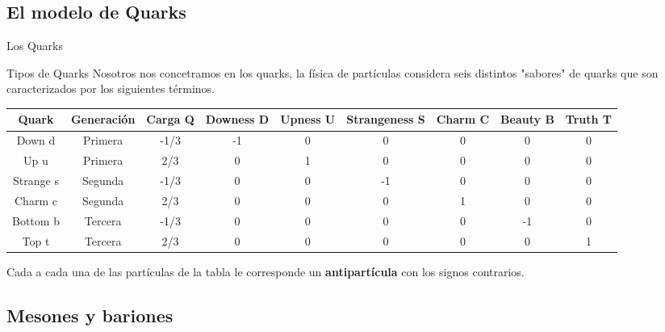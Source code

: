 \subsection{El modelo de Quarks}

\begin{frame}{Los Quarks}
    \begin{block}{Tipos de Quarks}
        Nosotros nos concetramos en los quarks, la física de partículas considera seis distintos "sabores" de quarks que son caracterizados por los siguientes términos.
    \end{block}
    \begin{table}[h]
        \centering
        \begin{adjustbox}{max width=\textwidth}
          \begin{tabular}{c|c|c|c|c|c|c|c|c}
            Quark &  Generación & Carga Q & Downess D & Upness U & Strangeness S & Charm C & Beauty B & Truth T\\
            \hline
            Down d    & Primera & -1/3 & -1 & 0 & 0  & 0 & 0  & 0 \\
            Up u      & Primera & 2/3  & 0  & 1 & 0  & 0 & 0  & 0 \\
            Strange s & Segunda & -1/3 & 0  & 0 & -1 & 0 & 0  & 0 \\
            Charm c   & Segunda & 2/3  & 0  & 0 & 0  & 1 & 0  & 0 \\
            Bottom b  & Tercera & -1/3 & 0  & 0 & 0  & 0 & -1 & 0 \\
            Top t     & Tercera & 2/3  & 0  & 0 & 0  & 0 & 0  & 1 
        \end{tabular}
        \end{adjustbox}
    \end{table}
    
    Cada a cada una de las partículas de la tabla le corresponde un \textbf{antipartícula} con los signos contrarios.
    
\end{frame}

\subsection{Mesones y bariones}


